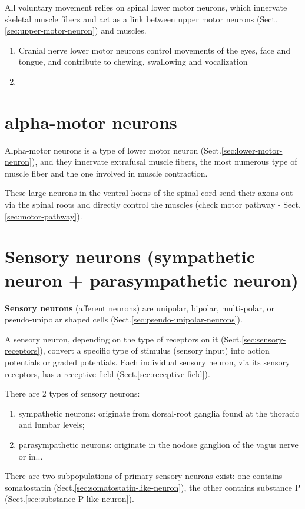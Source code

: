 All voluntary movement relies on spinal lower motor neurons, which innervate
skeletal muscle fibers and act as a link between upper motor neurons
(Sect.\ref{sec:upper-motor-neuron}) and muscles.
\begin{enumerate}
  \item  Cranial nerve lower motor neurons control movements of the eyes, face
  and tongue, and contribute to chewing, swallowing and vocalization
  
  \item 
\end{enumerate}



\section{alpha-motor neurons}
\label{sec:alpha-motor-neuron}

Alpha-motor neurons is a type of lower motor neuron
(Sect.\ref{sec:lower-motor-neuron}), and they innervate extrafusal muscle
fibers, the most numerous type of muscle fiber and the one involved in muscle
contraction.

These large neurons in the ventral horns of the spinal cord send their axons out
via the spinal roots and directly control the muscles (check motor pathway -
Sect.\ref{sec:motor-pathway}).



\section{Sensory neurons (sympathetic neuron + parasympathetic neuron)}
\label{sec:sensory_neuron}
\label{sec:sympathetic-neuron}
\label{sec:parasympathetic-neuron}

{\bf Sensory neurons} (afferent neurons) are unipolar, bipolar,
multi-polar, or pseudo-unipolar shaped cells
(Sect.\ref{sec:pseudo-unipolar-neurons}).

A sensory neuron, depending on the type of receptors on it
(Sect.\ref{sec:sensory-receptors}), convert a specific type of stimulus (sensory
input) into action potentials or graded potentials.
Each individual sensory neuron, via its sensory receptors, has a receptive field
(Sect.\ref{sec:receptive-field}).

There are 2 types of sensory neurons:
\begin{enumerate}
  \item sympathetic neurons:  originate from dorsal-root ganglia found at the
  thoracic and lumbar levels; 
  
  \item parasympathetic neurons: originate in the nodose ganglion of the
  vagus nerve or in...
\end{enumerate}
There are  two subpopulations of primary sensory neurons exist:
one contains somatostatin (Sect.\ref{sec:somatostatin-like-neuron}), the other
contains substance P (Sect.\ref{sec:substance-P-like-neuron}).

